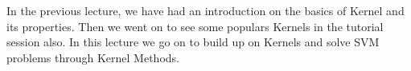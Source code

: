 \documentclass[12pt]{article}
\begin{document}












In the previous lecture, we have had an introduction on the basics of Kernel and its properties. Then we went on to see some populars Kernels in the tutorial session also. In this lecture we go on to build up on Kernels and solve SVM problems through Kernel Methods.
\end{document}
